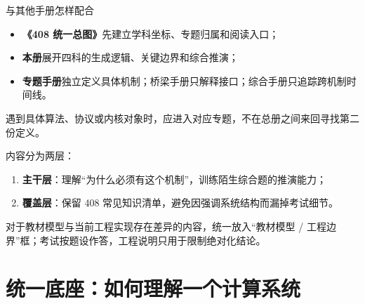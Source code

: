\documentclass[11pt,a4paper,openany]{ctexbook}
\newcommand{\key}[1]{\textbf{\color{deep}#1}}
\begin{document}
\begin{methodbox}{与其他手册怎样配合}
\begin{itemize}
  \item \key{《408 统一总图》}先建立学科坐标、专题归属和阅读入口；
  \item \key{本册}展开四科的生成逻辑、关键边界和综合推演；
  \item \key{专题手册}独立定义具体机制；桥梁手册只解释接口；综合手册只追踪跨机制时间线。
\end{itemize}
遇到具体算法、协议或内核对象时，应进入对应专题，不在总册之间来回寻找第二份定义。
\end{methodbox}

内容分为两层：
\begin{enumerate}
  \item \key{主干层}：理解“为什么必须有这个机制”，训练陌生综合题的推演能力；
  \item \key{覆盖层}：保留 408 常见知识清单，避免因强调系统结构而漏掉考试细节。
\end{enumerate}

对于教材模型与当前工程实现存在差异的内容，统一放入“教材模型 / 工程边界”框；考试按题设作答，工程说明只用于限制绝对化结论。

\tableofcontents

\mainmatter

\chapter{统一底座：如何理解一个计算系统}
\end{document}
